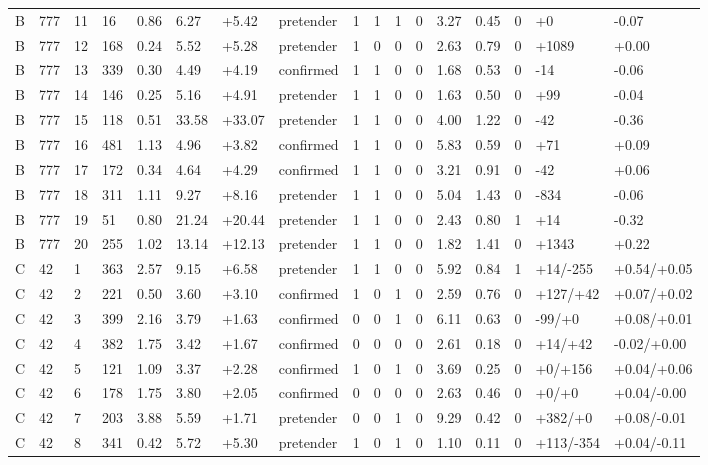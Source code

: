 \documentclass[11pt,a4paper]{article}
\begin{document}
{\begin{longtable}[]{@{}lllllllllllllllll@{}}
B & 777 & 11 & 16 & 0.86 & 6.27 & +5.42 & pretender & 1 & 1 & 1 & 0 & 3.27 & 0.45 & 0 & +0 & -0.07 \\
B & 777 & 12 & 168 & 0.24 & 5.52 & +5.28 & pretender & 1 & 0 & 0 & 0 & 2.63 & 0.79 & 0 & +1089 & +0.00 \\
B & 777 & 13 & 339 & 0.30 & 4.49 & +4.19 & confirmed & 1 & 1 & 0 & 0 & 1.68 & 0.53 & 0 & -14 & -0.06 \\
B & 777 & 14 & 146 & 0.25 & 5.16 & +4.91 & pretender & 1 & 1 & 0 & 0 & 1.63 & 0.50 & 0 & +99 & -0.04 \\
B & 777 & 15 & 118 & 0.51 & 33.58 & +33.07 & pretender & 1 & 1 & 0 & 0 & 4.00 & 1.22 & 0 & -42 & -0.36 \\
B & 777 & 16 & 481 & 1.13 & 4.96 & +3.82 & confirmed & 1 & 1 & 0 & 0 & 5.83 & 0.59 & 0 & +71 & +0.09 \\
B & 777 & 17 & 172 & 0.34 & 4.64 & +4.29 & confirmed & 1 & 1 & 0 & 0 & 3.21 & 0.91 & 0 & -42 & +0.06 \\
B & 777 & 18 & 311 & 1.11 & 9.27 & +8.16 & pretender & 1 & 1 & 0 & 0 & 5.04 & 1.43 & 0 & -834 & -0.06 \\
B & 777 & 19 & 51 & 0.80 & 21.24 & +20.44 & pretender & 1 & 1 & 0 & 0 & 2.43 & 0.80 & 1 & +14 & -0.32 \\
B & 777 & 20 & 255 & 1.02 & 13.14 & +12.13 & pretender & 1 & 1 & 0 & 0 & 1.82 & 1.41 & 0 & +1343 & +0.22 \\
C & 42 & 1 & 363 & 2.57 & 9.15 & +6.58 & pretender & 1 & 1 & 0 & 0 & 5.92 & 0.84 & 1 & +14/-255 & +0.54/+0.05 \\
C & 42 & 2 & 221 & 0.50 & 3.60 & +3.10 & confirmed & 1 & 0 & 1 & 0 & 2.59 & 0.76 & 0 & +127/+42 & +0.07/+0.02 \\
C & 42 & 3 & 399 & 2.16 & 3.79 & +1.63 & confirmed & 0 & 0 & 1 & 0 & 6.11 & 0.63 & 0 & -99/+0 & +0.08/+0.01 \\
C & 42 & 4 & 382 & 1.75 & 3.42 & +1.67 & confirmed & 0 & 0 & 0 & 0 & 2.61 & 0.18 & 0 & +14/+42 & -0.02/+0.00 \\
C & 42 & 5 & 121 & 1.09 & 3.37 & +2.28 & confirmed & 1 & 0 & 1 & 0 & 3.69 & 0.25 & 0 & +0/+156 & +0.04/+0.06 \\
C & 42 & 6 & 178 & 1.75 & 3.80 & +2.05 & confirmed & 0 & 0 & 0 & 0 & 2.63 & 0.46 & 0 & +0/+0 & +0.04/-0.00 \\
C & 42 & 7 & 203 & 3.88 & 5.59 & +1.71 & pretender & 0 & 0 & 1 & 0 & 9.29 & 0.42 & 0 & +382/+0 & +0.08/-0.01 \\
C & 42 & 8 & 341 & 0.42 & 5.72 & +5.30 & pretender & 1 & 0 & 1 & 0 & 1.10 & 0.11 & 0 & +113/-354 & +0.04/-0.11 \\

\end{longtable}}
\end{document}

